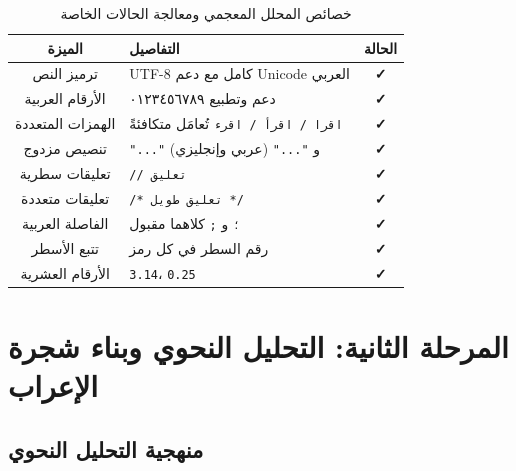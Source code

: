 \documentclass[12pt,a4paper]{report}
\begin{document}
\begin{table}[H]
\caption{\arabicfont خصائص المحلل المعجمي ومعالجة الحالات الخاصة}
\label{tab:lexer-features}
\centering
\begin{tabularx}{\textwidth}{|c|X|c|}
\hline
\rowcolor{TableHead}
\textbf{\arabicfont الميزة} & \textbf{\arabicfont التفاصيل} & \textbf{\arabicfont الحالة} \\
\hline
\arabicfont ترميز النص & \arabicfont UTF-8 كامل مع دعم Unicode العربي & \textcolor{SuccessGreen}{\textbf{✓}} \\
\hline
\rowcolor{TableAlt}
\arabicfont الأرقام العربية & \arabicfont دعم وتطبيع ٠١٢٣٤٥٦٧٨٩ & \textcolor{SuccessGreen}{\textbf{✓}} \\
\hline
\arabicfont الهمزات المتعددة & \arabicfont \texttt{اقرا / اقرأ / اقرء} تُعامَل متكافئةً & \textcolor{SuccessGreen}{\textbf{✓}} \\
\hline
\rowcolor{TableAlt}
\arabicfont تنصيص مزدوج & \arabicfont \texttt{"..."} و \texttt{"..."} (عربي وإنجليزي) & \textcolor{SuccessGreen}{\textbf{✓}} \\
\hline
\arabicfont تعليقات سطرية & \arabicfont \texttt{// تعليق} & \textcolor{SuccessGreen}{\textbf{✓}} \\
\hline
\rowcolor{TableAlt}
\arabicfont تعليقات متعددة & \arabicfont \texttt{/* تعليق طويل */} & \textcolor{SuccessGreen}{\textbf{✓}} \\
\hline
\arabicfont الفاصلة العربية & \arabicfont \texttt{؛} و \texttt{;} كلاهما مقبول & \textcolor{SuccessGreen}{\textbf{✓}} \\
\hline
\rowcolor{TableAlt}
\arabicfont تتبع الأسطر & \arabicfont رقم السطر في كل رمز & \textcolor{SuccessGreen}{\textbf{✓}} \\
\hline
\arabicfont الأرقام العشرية & \arabicfont \texttt{3.14}، \texttt{0.25} & \textcolor{SuccessGreen}{\textbf{✓}} \\
\hline
\end{tabularx}
\end{table}

\chapter{المرحلة الثانية: التحليل النحوي وبناء شجرة الإعراب}

\section{منهجية التحليل النحوي}
\end{document}
